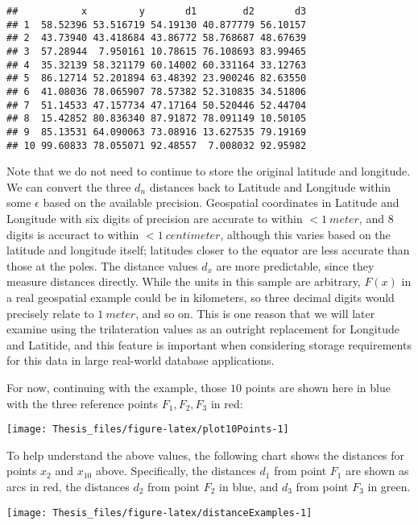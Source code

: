 \documentclass[]{article}
\begin{document}
\begin{verbatim}
##           x         y       d1        d2       d3
## 1  58.52396 53.516719 54.19130 40.877779 56.10157
## 2  43.73940 43.418684 43.86772 58.768687 48.67639
## 3  57.28944  7.950161 10.78615 76.108693 83.99465
## 4  35.32139 58.321179 60.14002 60.331164 33.12763
## 5  86.12714 52.201894 63.48392 23.900246 82.63550
## 6  41.08036 78.065907 78.57382 52.310835 34.51806
## 7  51.14533 47.157734 47.17164 50.520446 52.44704
## 8  15.42852 80.836340 87.91872 78.091149 10.50105
## 9  85.13531 64.090063 73.08916 13.627535 79.19169
## 10 99.60833 78.055071 92.48557  7.008032 92.95982
\end{verbatim}

Note that we do not need to continue to store the original latitude and
longitude. We can convert the three \(d_n\) distances back to Latitude
and Longitude within some \(\epsilon\) based on the available precision.
Geospatial coordinates in Latitude and Longitude with six digits of
precision are accurate to within \(<1\ meter\), and 8 digits is accuract
to within \(<1\ centimeter\), although this varies based on the latitude
and longitude itself; latitudes closer to the equator are less accurate
than those at the poles. The distance values \(d_x\) are more
predictable, since they measure distances directly. While the units in
this sample are arbitrary, \(F(x)\) in a real geospatial example could
be in kilometers, so three decimal digits would precisely relate to
\(1\ meter\), and so on. This is one reason that we will later examine
using the trilateration values as an outright replacement for Longitude
and Latitide, and this feature is important when considering storage
requirements for this data in large real-world database applications.

For now, continuing with the example, those \(10\) points are shown here
in blue with the three reference points \(F_1, F_2, F_3\) in red:

\begin{center}\texttt{[image: Thesis\_files/figure-latex/plot10Points-1]} \end{center}

To help understand the above values, the following chart shows the
distances for points \(x_2\) and \(x_10\) above. Specifically, the
distances \(d_1\) from point \(F_1\) are shown as arcs in red, the
distances \(d_2\) from point \(F_2\) in blue, and \(d_3\) from point
\(F_3\) in green.

\begin{center}\texttt{[image: Thesis\_files/figure-latex/distanceExamples-1]} \end{center}
\end{document}
